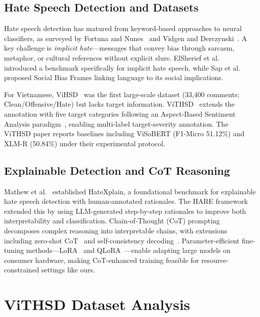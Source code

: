 \documentclass[conference]{IEEEtran}
\begin{document}
\subsection{Hate Speech Detection and Datasets}

Hate speech detection has matured from keyword-based approaches to neural
classifiers, as surveyed by Fortuna and Nunes~\cite{Fortuna2018Survey} and
Vidgen and Derczynski~\cite{Vidgen2020Directions}. A key challenge is
\textit{implicit hate}---messages that convey bias through sarcasm, metaphor, or
cultural references without explicit slurs. ElSherief et
al.~\cite{ElSherief2021Latent} introduced a benchmark specifically for implicit
hate speech, while Sap et al.~\cite{Sap2020SocialBias} proposed Social Bias
Frames linking language to its social implications.

For Vietnamese, ViHSD~\cite{10.1007/978-3-030-79457-6_35} was the first
large-scale dataset (33,400 comments; Clean/Offensive/Hate) but lacks target
information. ViTHSD~\cite{vithsd} extends the annotation with five target
categories following an Aspect-Based Sentiment Analysis
paradigm~\cite{Pontiki2014SemEval4}, enabling multi-label target-severity
annotation. The ViTHSD paper reports baselines including ViSoBERT (F1-Micro
51.12\%) and XLM-R (50.84\%) under their experimental protocol.

\subsection{Explainable Detection and CoT Reasoning}

Mathew et al.~\cite{Mathew2021HateXplain} established HateXplain, a foundational
benchmark for explainable hate speech detection with human-annotated rationales.
The HARE framework~\cite{Yang2023HARE} extended this by using LLM-generated
step-by-step rationales to improve both interpretability and classification.
Chain-of-Thought (CoT) prompting~\cite{Wei2022ChainOfThought} decomposes complex
reasoning into interpretable chains, with extensions including zero-shot
CoT~\cite{Kojima2022ZeroShot} and self-consistency
decoding~\cite{Wang2023SelfConsistency}. Parameter-efficient fine-tuning
methods---LoRA~\cite{Hu2022LoRA} and QLoRA~\cite{Dettmers2023QLoRA}---enable
adapting large models on consumer hardware, making CoT-enhanced training feasible
for resource-constrained settings like ours.


\section{ViTHSD Dataset Analysis}\label{sec:dataset}
\end{document}
